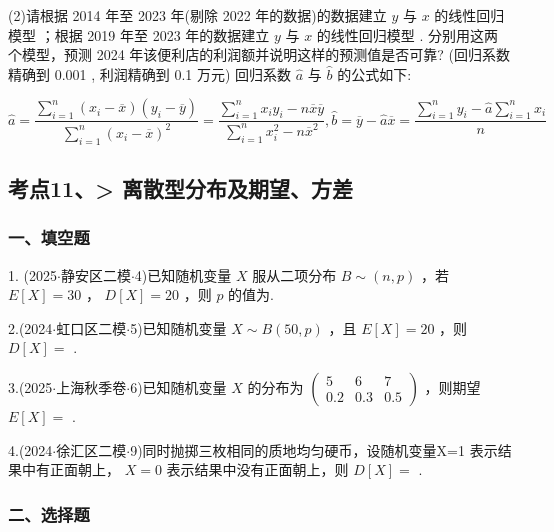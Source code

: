 (2)请根据 2014 年至 2023 年(剔除 2022 年的数据)的数据建立 $y$ 与 $x$ 的线性回归模型  ；根据 2019 年至 2023 年的数据建立 $y$ 与 $x$ 的线性回归模型 . 分别用这两个模型，预测 2024 年该便利店的利润额并说明这样的预测值是否可靠? (回归系数精确到 0.001 , 利润精确到 0.1 万元) 回归系数 $\widehat{a}$ 与 $\widehat{b}$ 的公式如下:

$
\widehat{a} = \dfrac{\mathop{\sum }\limits_{{i = 1}}^{n}\left( {{x}_{i} - \overline{x}}\right) \left( {{y}_{i} - \overline{y}}\right) }{\mathop{\sum }\limits_{{i = 1}}^{n}{\left( {x}_{i} - \overline{x}\right) }^{2}} = \dfrac{\mathop{\sum }\limits_{{i = 1}}^{n}{x}_{i}{y}_{i} - n\overline{x}\overline{y}}{\mathop{\sum }\limits_{{i = 1}}^{n}{x}_{i}^{2} - n{\overline{x}}^{2}},\widehat{b} = \overline{y} - \widehat{a}\overline{x} = \dfrac{\mathop{\sum }\limits_{{i = 1}}^{n}{y}_{i} - \widehat{a}\mathop{\sum }\limits_{{i = 1}}^{n}{x}_{i}}{n}
$

\subsection*{考点11、> 离散型分布及期望、方差}

\subsubsection*{一、填空题}

1. (2025$\cdot$静安区二模$\cdot$4)已知随机变量 $X$ 服从二项分布 $B \sim  \left( {n,p}\right)$ ，若 $E\left\lbrack  X\right\rbrack   = {30}$ ， $D\left\lbrack  X\right\rbrack   = {20}$ ，则 $p$ 的值为\blkda[2]{}.

2.(2024$\cdot$虹口区二模$\cdot$5)已知随机变量 $X \sim  B\left( {{50},p}\right)$ ，且 $E\left\lbrack  X\right\rbrack   = {20}$ ，则 $D\left\lbrack  X\right\rbrack   =$ \blkda[2]{}.

3.(2025$\cdot$上海秋季卷$\cdot$6)已知随机变量 $X$ 的分布为 $\left( \begin{matrix} 5 & 6 & 7 \\  {0.2} & {0.3} & {0.5} \end{matrix}\right)$ ，则期望 $E\left\lbrack  X\right\rbrack   =$ \blkda[2]{}.

4.(2024$\cdot$徐汇区二模$\cdot$9)同时抛掷三枚相同的质地均匀硬币，设随机变量X=1 表示结果中有正面朝上， $X = 0$ 表示结果中没有正面朝上，则 $D\left\lbrack  X\right\rbrack   =$ \blkda[2]{}.

\subsubsection*{二、选择题}

